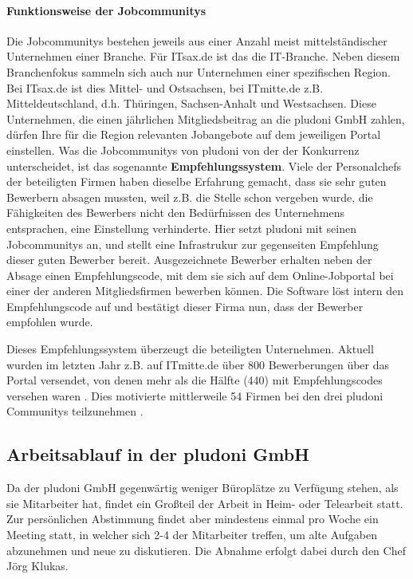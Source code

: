 \paragraph{Funktionsweise der Jobcommunitys}
Die Jobcommunitys bestehen jeweils aus einer Anzahl meist mittelständischer Unternehmen einer Branche. Für ITsax.de ist das die IT-Branche. Neben diesem Branchenfokus sammeln sich auch nur Unternehmen einer spezifischen Region. Bei ITsax.de ist dies Mittel- und Ostsachsen, bei ITmitte.de z.B. Mitteldeutschland, d.h. Thüringen, Sachsen-Anhalt und Westsachsen. 
Diese Unternehmen, die einen jährlichen Mitgliedsbeitrag an die pludoni GmbH zahlen, dürfen Ihre für die Region relevanten Jobangebote auf dem jeweiligen Portal einstellen. Was die Jobcommunitys von pludoni von der der Konkurrenz unterscheidet, ist das sogenannte \textbf{Empfehlungssystem}. 
Viele der Personalchefs der beteiligten Firmen haben dieselbe Erfahrung gemacht, dass sie sehr guten Bewerbern absagen mussten, weil z.B. die Stelle schon vergeben wurde, die Fähigkeiten des Bewerbers nicht den Bedürfnissen des Unternehmens entsprachen, eine Einstellung verhinderte. Hier setzt pludoni mit seinen Jobcommunitys an, und stellt eine Infrastrukur zur gegenseiten Empfehlung dieser guten Bewerber bereit.  Ausgezeichnete Bewerber erhalten neben der Absage einen Empfehlungscode, mit dem sie sich auf dem Online-Jobportal bei einer der anderen Mitgliedsfirmen bewerben können. Die Software löst intern den Empfehlungscode auf und bestätigt dieser Firma nun, dass der Bewerber empfohlen wurde. 

Dieses Empfehlungssystem überzeugt die beteiligten Unternehmen. Aktuell wurden im letzten Jahr z.B. auf ITmitte.de über 800 Bewerberungen über das Portal versendet, von denen mehr als die Hälfte (440) mit Empfehlungscodes versehen waren \citep{joerg_klukas_startseite_2011}. Dies motivierte mittlerweile 54 Firmen bei den drei pludoni Communitys teilzunehmen \citep{joerg_klukas_referenzen_2011}.

\subsection{Arbeitsablauf in der pludoni GmbH}

Da der pludoni GmbH gegenwärtig weniger Büroplätze zu Verfügung stehen, als sie Mitarbeiter hat, findet ein Großteil der Arbeit in Heim- oder Telearbeit statt.
Zur persönlichen Abstimmung findet aber mindestens einmal pro Woche ein Meeting statt, in welcher sich 2-4 der Mitarbeiter treffen, um alte Aufgaben abzunehmen und neue zu diskutieren. Die Abnahme erfolgt dabei durch den Chef Jörg Klukas.

